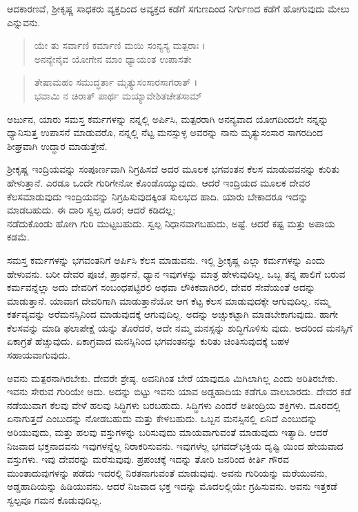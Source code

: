 ಆದಕಾರಣವೆ, ಶ್ರೀಕೃಷ್ಣ ಸಾಧಕರು ವ್ಯಕ್ತದಿಂದ ಅವ್ಯಕ್ತದ ಕಡೆಗೆ ಸಗುಣದಿಂದ ನಿರ್ಗುಣದ ಕಡೆಗೆ ಹೋಗುವುದು ಮೇಲು ಎನ್ನುವನು.

\begin{verse}
ಯೇ ತು ಸರ್ವಾಣಿ ಕರ್ಮಾಣಿ ಮಯಿ ಸಂನ್ಯಸ್ಯ ಮತ್ಪರಾಃ ।\\ಅನನ್ಯೇನೈವ ಯೋಗೇನ ಮಾಂ ಧ್ಯಾಯಂತ ಉಪಾಸತೇ 
\end{verse}

\begin{verse}
ತೇಷಾಮಹಂ ಸಮುದ್ಧರ್ತಾ ಮೃತ್ಯುಸಂಸಾರಸಾಗರಾತ್ ।\\ಭವಾಮಿ ನ ಚಿರಾತ್ ಪಾರ್ಥ ಮಯ್ಯಾವೇಶಿತಚೇತಸಾಮ್ 
\end{verse}

{\small ಅರ್ಜುನ, ಯಾರು ಸಮಸ್ತ ಕರ್ಮಗಳನ್ನು ನನ್ನಲ್ಲಿ ಅರ್ಪಿಸಿ, ಮತ್ಪರರಾಗಿ ಅನನ್ಯವಾದ ಯೋಗದಿಂದಲೇ ನನ್ನನ್ನು ಧ್ಯಾನಿಸುತ್ತ ಉಪಾಸನೆ ಮಾಡುವರೊ, ನನ್ನಲ್ಲಿ ನೆಟ್ಟ ಮನಸ್ಸುಳ್ಳ ಅವರನ್ನು ನಾನು ಮೃತ್ಯುಸಂಸಾರ ಸಾಗರದಿಂದ ಶೀಘ್ರವಾಗಿ ಉದ್ಧಾರ ಮಾಡುತ್ತೇನೆ.}

ಶ್ರೀಕೃಷ್ಣ ಇಂದ್ರಿಯವನ್ನು ಸಂಪೂರ್ಣವಾಗಿ ನಿಗ್ರಹಿಸದೆ ಅದರ ಮೂಲಕ ಭಗವಂತನ ಕೆಲಸ ಮಾಡುವವನನ್ನು ಕುರಿತು ಹೇಳುತ್ತಾನೆ. ಎರಡೂ ಒಂದೇ ಗುರಿಗೇನೋ ಕೊಂಡೊಯ್ಯುವುದು. ಆದರೆ ಇಂದ್ರಿಯದ ಮೂಲಕ ದೇವರ ಕೆಲಸಮಾಡುವುದು ಇಂದ್ರಿಯವನ್ನು ನಿಗ್ರಹಿಸುವುದಕ್ಕಿಂತ ಸುಲಭದ ಹಾದಿ. ಯಾರು ಬೇಕಾದರೂ ಇದನ್ನು ಮಾಡಬಹುದು. ಈ ದಾರಿ ಸ್ವಲ್ಪ ದೂರ; ಆದರೆ ಕಡಿದಲ್ಲ;\\ನಡೆದುಕೊಂಡು ಹೋಗಿ ಗುರಿ ಮುಟ್ಟಬಹುದು. ಸ್ವಲ್ಪ ನಿಧಾನವಾಗಬಹುದು, ಅಷ್ಟೆ. ಆದರೆ ಕಷ್ಟ ಮತ್ತು ಅಪಾಯ ಕಡಮೆ.

ಸಮಸ್ತ ಕರ್ಮಗಳನ್ನು ಭಗವಂತನಿಗೆ ಅರ್ಪಿಸಿ ಕೆಲಸ ಮಾಡುವನು. ಇಲ್ಲಿ ಶ್ರೀಕೃಷ್ಣ ಎಲ್ಲಾ ಕರ್ಮಗಳನ್ನು ಎಂದು ಹೇಳುವನು. ಬರೀ ದೇವರ ಪೂಜೆ, ಪ್ರಾರ್ಥನೆ, ಧ್ಯಾನ ಇವುಗಳನ್ನು ಮಾತ್ರ ಹೇಳುವುದಿಲ್ಲ. ಒಬ್ಬ ತನ್ನ ಪಾಲಿಗೆ ಬರುವ ಕರ್ಮವನ್ನೆಲ್ಲಾ ಅದು ದೇವರಿಗೆ ಸಂಬಂಧಪಟ್ಟಿರಲಿ ಅಥವಾ ಲೌಕಿಕವಾಗಿರಲಿ, ದೇವರ ಸೇವೆಯಂತೆ ಅದನ್ನು ಮಾಡುತ್ತಾನೆ. ಯಾವಾಗ ದೇವರಿಗಾಗಿ ಮಾಡುತ್ತಾನೆಯೋ ಆಗ ಕೆಟ್ಟ ಕೆಲಸ ಮಾಡುವುದಕ್ಕೇ ಆಗುವುದಿಲ್ಲ. ನಮ್ಮ ಕರ್ತವ್ಯವನ್ನು ಅರೆಮನಸ್ಸಿನಿಂದ ಮಾಡುವುದಕ್ಕೆ ಆಗುವುದಿಲ್ಲ. ಅದನ್ನು ಅಚ್ಚುಕಟ್ಟಾಗಿ ಮಾಡಬೇಕಾಗುವುದು. ಹಾಗೇ ಕೆಲಸವನ್ನು ಮಾಡಿ ಫಲಾಪೇಕ್ಷೆ ಯನ್ನು ತೊರೆದರೆ, ಅದೇ ನಮ್ಮ ಮನಸ್ಸನ್ನು ಶುದ್ಧಿಗೊಳಿಸು ವುದು. ಅದರಿಂದ ಮನಸ್ಸಿಗೆ ಏಕಾಗ್ರತೆ ಹೆಚ್ಚುವುದು. ಏಕಾಗ್ರವಾದ ಮನಸ್ಸಿನಿಂದ ಭಗವಂತನನ್ನು ಕುರಿತು ಚಿಂತಿಸುವುದಕ್ಕೆ ಬಹಳ ಸಹಾಯವಾಗುವುದು.

ಅವನು ಮತ್ಪರನಾಗಿರಬೇಕು. ದೇವರೇ ಶ್ರೇಷ್ಠ. ಅವನಿಗಿಂತ ಬೇರೆ ಯಾವುದೂ ಮಿಗಿಲಾಗಿಲ್ಲ ಎಂದು ಅರಿತಿರಬೇಕು. ಇವನು ಸೇರುವ ಗುರಿಯೇ ಅದು. ಅದನ್ನು ಬಿಟ್ಟು ಇವನು ಯಾವ ಅಡ್ಡಹಾದಿಯ ಕಡೆಗೂ ವಾಲಬಾರದು. ದೇವರ ಕಡೆ ನಡೆಯುವಾಗ ಕೆಲವು ವೇಳೆ ಹಲವು ಸಿದ್ಧಿಗಳು ಬರಬಹುದು. ಸಿದ್ಧಿಗಳು ಎಂದರೆ ಅತೀಂದ್ರಿಯ ಶಕ್ತಿಗಳು. ದೂರದಲ್ಲಿ ಏನಾಗುತ್ತದೆ ಎಂಬುದನ್ನು ನೋಡಬಹುದು ಮತ್ತು ಕೇಳಬಹುದು. ಒಬ್ಬನ ಮನಸ್ಸಿನಲ್ಲಿ ಏನಿದೆ ಎಂಬುದನ್ನು ಅರಿಯುವುದು, ಮತ್ತು ಹಲವು ವಸ್ತುಗಳನ್ನು ಬರಿಸುವುದು ಮಾಯವಾಗುವಂತೆ ಮಾಡುವುದು ಇತ್ಯಾದಿ. ಆದರೆ ನಿಜವಾದ ಭಕ್ತನಾದವನು ಇವುಗಳನ್ನೆಲ್ಲ ನಿರಾಕರಿಸುವನು. ಇವುಗಳೆಲ್ಲ ಭಗವದ್​ಭಕ್ತಿಯ ದೃಷ್ಟಿ ಯಿಂದ ಹೇಯವಾದ ವಸ್ತುಗಳು. ಇವು ದೇವರನ್ನು ಮರೆಸುವುವು. ಪ್ರಪಂಚಕ್ಕೆ ಇದನ್ನು ತೋರಿ ಜನರಿಂದ ಕೀರ್ತಿ ಗೌರವ ಮುಂತಾದುವುಗಳನ್ನು ಪಡೆದು ಇದರಲ್ಲಿ ನಿರತನಾಗುವಂತೆ ಮಾಡುವುವು. ಅವನು ಗುರಿಯನ್ನು ಮರೆಯುವನು, ಅಡ್ಡಹಾದಿಯನ್ನು ಹಿಡಿಯುವನು. ಆದರೆ ನಿಜವಾದ ಭಕ್ತ ಇದನ್ನು ಮೊದಲಲ್ಲಿಯೇ ಗ್ರಹಿಸುವನು. ಅವನು ಇತ್ತಕಡೆ ಸ್ವಲ್ಪವೂ ಗಮನ ಕೊಡುವುದಿಲ್ಲ.

